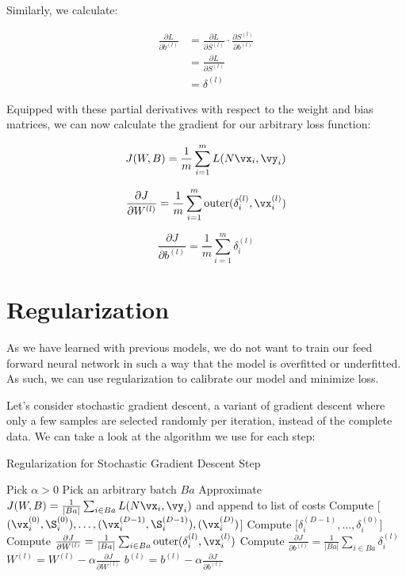 \smallskip
Similarly, we calculate:

\begin{ceqn}
\begin{align*}
    \frac{\partial L}{\partial b^{(l)}} &= \frac{\partial L}{\partial S^{(l)}}\cdot\frac{\partial S^{(l)}}{\partial b^{(l)}} \\
    &= \frac{\partial L}{\partial S^{(l)}} \\
    &= \delta^{(l)}
\end{align*}
\end{ceqn}

\medskip
Equipped with these partial derivatives with respect to the weight and bias matrices, we can now calculate the gradient for our arbitrary loss function:

$$J(W,B)=\frac{1}{m}\sum_{i=1}^{m}L(N\vx_{i},\vy_{i})$$

$$\frac{\partial J}{\partial W^{(l)}}=\frac{1}{m}\sum_{i=1}^{m}{\mathrm{outer}(\delta_{i}^{(l)},\vx_{i}^{(l)})}$$

$$\frac{\partial J}{\partial b^{(l)}}=\frac{1}{m}\sum_{i=1}^{m}\delta_{i}^{(l)}$$

\section{Regularization}

As we have learned with previous models, we do not want to train our feed forward neural network in such a way that the model is overfitted or underfitted. As such, we can use regularization to calibrate our model and minimize loss.

Let's consider stochastic gradient descent, a variant of gradient descent where only a few samples are selected randomly per iteration, instead of the complete data. We can take a look at the algorithm we use for each step:

\begin{algorithm}
    \caption{Regularization for Stochastic Gradient Descent Step}
    \begin{algorithmic}[1]
            \State Pick $\alpha > 0$
            \State Pick an arbitrary batch $Ba$
            \State Approximate $J(W,B)=\frac{1}{|Ba|}\sum_{i\in Ba}L(N\vx_{i},\vy_{i})$ and append to list of costs
        \State Compute [$(\vx_{i}^{(0)}, \S_{i}^{(0)}),\ldots,(\vx_{i}^{(D-1)}, \S_{i}^{(D-1)}),(\vx_{i}^{(D)})$]
        \State Compute [$\delta_{i}^{(D-1)},\ldots,\delta_{i}^{(0)}$]
        \State Compute $\frac{\partial J}{\partial W^{(l)}}=\frac{1}{|Ba|}\sum_{i\in Ba}{\mathrm{outer}(\delta_{i}^{(l)},\vx_{i}^{(l)})}$
		\State Compute $\frac{\partial J}{\partial b^{(l)}}=\frac{1}{|Ba|}\sum_{i \in Ba}\delta_{i}^{(l)}$
		\EndFor		
        \State $W^{(l)}= W^{(l)} - \alpha \frac{\partial J}{\partial W^{(l)}}$
        \State $b^{(l)}= b^{(l)} - \alpha \frac{\partial J}{\partial b^{(l)}}$
		\EndFor        
	\end{algorithmic} 
\end{algorithm}

